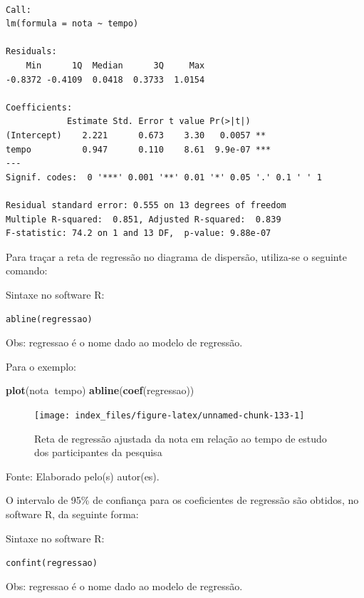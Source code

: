 \documentclass[12pt,portuguese,oneside]{book}
\newenvironment{Shaded}{\begin{snugshade}}{\end{snugshade}}
\newcommand{\KeywordTok}[1]{\textcolor[rgb]{0.13,0.29,0.53}{\textbf{#1}}}
\newcommand{\OperatorTok}[1]{\textcolor[rgb]{0.81,0.36,0.00}{\textbf{#1}}}
\newcommand{\NormalTok}[1]{#1}
\begin{document}
\begin{verbatim}

Call:
lm(formula = nota ~ tempo)

Residuals:
    Min      1Q  Median      3Q     Max 
-0.8372 -0.4109  0.0418  0.3733  1.0154 

Coefficients:
            Estimate Std. Error t value Pr(>|t|)    
(Intercept)    2.221      0.673    3.30   0.0057 ** 
tempo          0.947      0.110    8.61  9.9e-07 ***
---
Signif. codes:  0 '***' 0.001 '**' 0.01 '*' 0.05 '.' 0.1 ' ' 1

Residual standard error: 0.555 on 13 degrees of freedom
Multiple R-squared:  0.851, Adjusted R-squared:  0.839 
F-statistic: 74.2 on 1 and 13 DF,  p-value: 9.88e-07
\end{verbatim}

Para traçar a reta de regressão no diagrama de dispersão, utiliza-se o
seguinte comando:

Sintaxe no software R:

\texttt{abline(regressao)}

Obs: regressao é o nome dado ao modelo de regressão.

Para o exemplo:

\begin{Shaded}
\begin{Highlighting}[]
\KeywordTok{plot}\NormalTok{(nota}\OperatorTok{~}\NormalTok{tempo)}
\KeywordTok{abline}\NormalTok{(}\KeywordTok{coef}\NormalTok{(regressao))}
\end{Highlighting}
\end{Shaded}

\begin{figure}[H]

{\centering \texttt{[image: index\_files/figure-latex/unnamed-chunk-133-1]} 

}

\caption{Reta de regressão ajustada da nota em relação ao tempo de estudo dos participantes da pesquisa}\label{fig:unnamed-chunk-133}
\end{figure}

Fonte: Elaborado pelo(s) autor(es).

O intervalo de 95\% de confiança para os coeficientes de regressão são
obtidos, no software R, da seguinte forma:

Sintaxe no software R:

\texttt{confint(regressao)}

Obs: regressao é o nome dado ao modelo de regressão.
\end{document}
